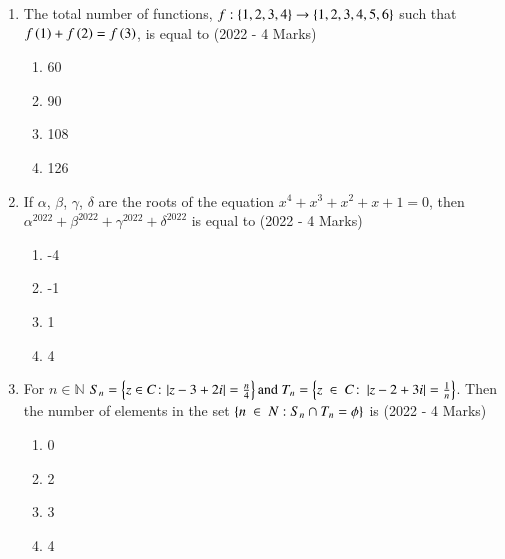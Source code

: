 \documentclass[journal]{IEEEtran}
\begin{document}
    \begin{enumerate}
    \item{
          	The total number of functions, $f : \left\{1, 2, 3, 4\right\} \to \left\{1, 2, 3, 4, 5, 6\right\}$ such that $f\left(1\right) + f\left(2\right) = f\left(3\right)$, is equal to \text{  }\hfill
                {(2022 - 4 Marks)}
                \begin{multicols}{4}
					\begin{enumerate}
						\item 60
						\item 90
						\item 108
						\item 126
					\end{enumerate}
				\end{multicols}
            }
    \item{
           	If $\alpha$, $\beta$, $\gamma$, $\delta$ are the roots of the equation $x^4 + x^3 + x^2 + x + 1 = 0$, then $\alpha^{2022} + \beta^{2022} + \gamma^{2022} + \delta^{2022}$ is equal to
           	\hfill
           	{(2022 - 4 Marks)}
                \begin{multicols}{4}
                	\begin{enumerate}
                		\item -4
                		\item -1
                		\item 1
                		\item 4
                	\end{enumerate}
                \end{multicols}
        }
\item{
        	
        	For $n \in \mathbb{N}$  $S_n=\left\{z\in C\colon |z-3+2i|=\frac{n}{4} \right\} \text{and}~ T_n=\left\{ z\ \in\ C \colon \left|z-2+3i\right|=\frac{1}{n}\right\}$. Then the number of elements in the set $ \left\{n\ \in\ N: S_n\cap T_n=\phi\right\}$ is
        	\hfill
        	{(2022 - 4 Marks)}
        	\begin{multicols}{4}
        		\begin{enumerate}
        			\item 0
        			\item 2
        			\item 3
        			\item 4
        		\end{enumerate}
        	\end{multicols}
        	
}
\end{enumerate}
\end{document}
